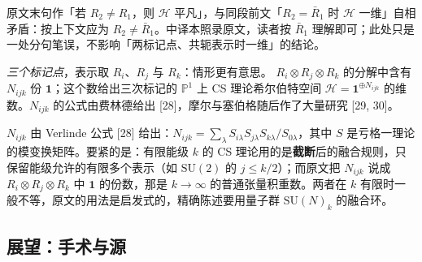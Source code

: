 \begin{yizhu}[原文疑误]
原文末句作「若 $R_2\ne R_1$，则 $\mathcal{H}$ 平凡」，与同段前文「$R_2=\bar R_1$ 时 $\mathcal{H}$ 一维」自相矛盾：按上下文应为 $R_2\ne\bar R_1$。中译本照录原文，读者按 $\bar R_1$ 理解即可；此处只是一处分句笔误，不影响「两标记点、共轭表示时一维」的结论。
\end{yizhu}

\emph{三个标记点}，表示取 $R_i$、$R_j$ 与 $R_k$：情形更有意思。
$R_i\otimes R_j\otimes R_k$ 的分解中含有 $N_{ijk}$ 份 $\mathbf{1}$；这个数给出三次标记的 $\mathbb{P}^1$ 上 CS 理论希尔伯特空间 $\mathcal{H}=\mathbf{1}^{\oplus N_{ijk}}$ 的维数。$N_{ijk}$ 的公式由费林德给出 [28]，摩尔与塞伯格随后作了大量研究 [29, 30]。

\begin{yizhu}[含糊点]
$N_{ijk}$ 由 Verlinde 公式 [28] 给出：$N_{ijk}=\sum_{\lambda}S_{i\lambda}S_{j\lambda}S_{k\lambda}/S_{0\lambda}$，其中 $S$ 是亏格一理论的模变换矩阵。要紧的是：有限能级 $k$ 的 CS 理论用的是\textbf{截断}后的融合规则，只保留能级允许的有限多个表示（如 $\mathrm{SU}(2)$ 的 $j\le k/2$）；而原文把 $N_{ijk}$ 说成 $R_i\otimes R_j\otimes R_k$ 中 $\mathbf{1}$ 的份数，那是 $k\to\infty$ 的普通张量积重数。两者在 $k$ 有限时一般不等，原文的用法是启发式的，精确陈述要用量子群 $\mathrm{SU}(N)_k$ 的融合环。
\end{yizhu}

\subsection{展望：手术与源}\label{sec:4.4}

